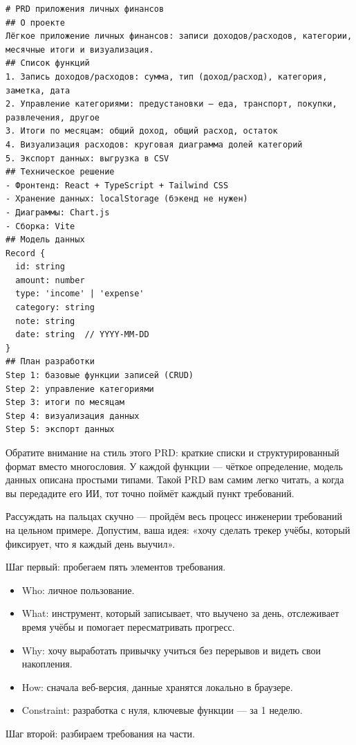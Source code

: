\begin{lstlisting}
# PRD приложения личных финансов
## О проекте
Лёгкое приложение личных финансов: записи доходов/расходов, категории, месячные итоги и визуализация.
## Список функций
1. Запись доходов/расходов: сумма, тип (доход/расход), категория, заметка, дата
2. Управление категориями: предустановки — еда, транспорт, покупки, развлечения, другое
3. Итоги по месяцам: общий доход, общий расход, остаток
4. Визуализация расходов: круговая диаграмма долей категорий
5. Экспорт данных: выгрузка в CSV
## Техническое решение
- Фронтенд: React + TypeScript + Tailwind CSS
- Хранение данных: localStorage (бэкенд не нужен)
- Диаграммы: Chart.js
- Сборка: Vite
## Модель данных
Record {
  id: string
  amount: number
  type: 'income' | 'expense'
  category: string
  note: string
  date: string  // YYYY-MM-DD
}
## План разработки
Step 1: базовые функции записей (CRUD)
Step 2: управление категориями
Step 3: итоги по месяцам
Step 4: визуализация данных
Step 5: экспорт данных
\end{lstlisting}

Обратите внимание на стиль этого PRD: краткие списки и структурированный формат вместо многословия. У каждой функции — чёткое определение, модель данных описана простыми типами. Такой PRD вам самим легко читать, а когда вы передадите его ИИ, тот точно поймёт каждый пункт требований.


Рассуждать на пальцах скучно — пройдём весь процесс инженерии требований на цельном примере. Допустим, ваша идея: «хочу сделать трекер учёбы, который фиксирует, что я каждый день выучил».

Шаг первый: пробегаем пять элементов требования.

\begin{itemize}
  \item Who: личное пользование.
  \item What: инструмент, который записывает, что выучено за день, отслеживает время учёбы и помогает пересматривать прогресс.
  \item Why: хочу выработать привычку учиться без перерывов и видеть свои накопления.
  \item How: сначала веб-версия, данные хранятся локально в браузере.
  \item Constraint: разработка с нуля, ключевые функции — за 1 неделю.
\end{itemize}

Шаг второй: разбираем требования на части.

